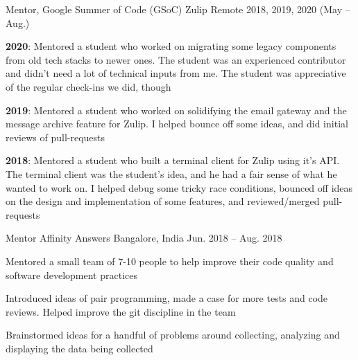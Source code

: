 
\begin{cventries}

  \cventry
      {Mentor, Google Summer of Code (GSoC) }
      {Zulip }
      {Remote} %
      {2018, 2019, 2020 (May -- Aug.)} %
      {
        \begin{cvitems} %
        \item {\textbf{2020}: Mentored a student who worked on migrating some legacy components from old tech stacks to newer ones. The student was an experienced contributor and didn't need a lot of technical inputs from me. The student was appreciative of the regular check-ins we did, though}
        \item {\textbf{2019}: Mentored a student who worked on solidifying the email gateway and the message archive feature for Zulip. I helped bounce off some ideas, and did initial reviews of pull-requests}
        \item {\textbf{2018}: Mentored a student who built a terminal client for Zulip using it's API. The terminal client was the student's idea, and he had a fair sense of what he wanted to work on. I helped debug some tricky race conditions, bounced off ideas on the design and implementation of some features, and reviewed/merged pull-requests}
        \end{cvitems}
      }
  \cventry
      {Mentor}
      {Affinity Answers }
      {Bangalore, India} %
      {Jun. 2018 -- Aug. 2018} %
      {
        \begin{cvitems} %
        \item {Mentored a small team of 7-10 people to help improve their code quality and software development practices}
        \item {Introduced ideas of pair programming, made a case for more tests and code reviews. Helped improve the git discipline in the team}
        \item {Brainstormed ideas for a handful of problems around collecting, analyzing and displaying the data being collected}
        \end{cvitems}
      }
\end{cventries}
